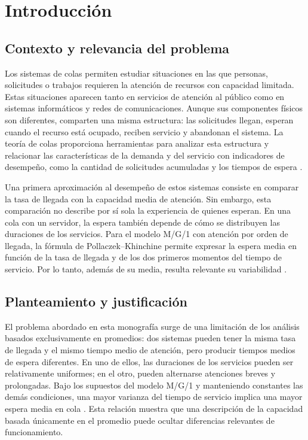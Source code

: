 
\section{Introducción}
\label{sec:introduccion}

\subsection{Contexto y relevancia del problema}
\label{subsec:contexto}

Los sistemas de colas permiten estudiar situaciones en las que personas, solicitudes o trabajos requieren la atención de recursos con capacidad limitada. Estas situaciones aparecen tanto en servicios de atención al público como en sistemas informáticos y redes de comunicaciones. Aunque sus componentes físicos son diferentes, comparten una misma estructura: las solicitudes llegan, esperan cuando el recurso está ocupado, reciben servicio y abandonan el sistema. La teoría de colas proporciona herramientas para analizar esta estructura y relacionar las características de la demanda y del servicio con indicadores de desempeño, como la cantidad de solicitudes acumuladas y los tiempos de espera \cite{lauberbonomo2021resetting}.

Una primera aproximación al desempeño de estos sistemas consiste en comparar la tasa de llegada con la capacidad media de atención. Sin embargo, esta comparación no describe por sí sola la experiencia de quienes esperan. En una cola con un servidor, la espera también depende de cómo se distribuyen las duraciones de los servicios. Para el modelo M/G/1 con atención por orden de llegada, la fórmula de Pollaczek--Khinchine permite expresar la espera media en función de la tasa de llegada y de los dos primeros momentos del tiempo de servicio. Por lo tanto, además de su media, resulta relevante su variabilidad \cite{virtamoMG1}.

\subsection{Planteamiento y justificación}
\label{subsec:planteamiento}

El problema abordado en esta monografía surge de una limitación de los análisis basados exclusivamente en promedios: dos sistemas pueden tener la misma tasa de llegada y el mismo tiempo medio de atención, pero producir tiempos medios de espera diferentes. En uno de ellos, las duraciones de los servicios pueden ser relativamente uniformes; en el otro, pueden alternarse atenciones breves y prolongadas. Bajo los supuestos del modelo M/G/1 y manteniendo constantes las demás condiciones, una mayor varianza del tiempo de servicio implica una mayor espera media en cola \cite{virtamoMG1}. Esta relación muestra que una descripción de la capacidad basada únicamente en el promedio puede ocultar diferencias relevantes de funcionamiento.

